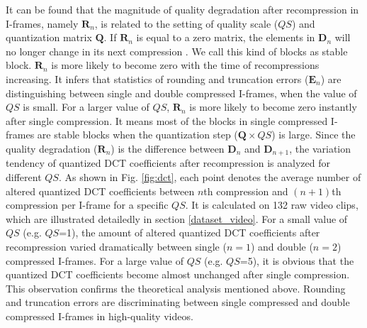 \documentclass[journal,sort]{IEEEtran}
\begin{document}
It can be found that the magnitude of quality degradation after recompression in I-frames, namely $\mathbf{R}_n$, is related to the setting of quality scale ($QS$) and quantization matrix $\mathbf{Q}$. If $\mathbf{R}_n$ is equal to a zero matrix, the elements in $\mathbf{D}_n$ will no longer change in its next compression \cite{yang2014effective}. We call this kind of blocks as stable block. $\mathbf{R}_n$ is more likely to become zero with the time of recompressions increasing. It infers that statistics of rounding and truncation errors ($\mathbf{E}_n$) are distinguishing between single and double compressed I-frames, when the value of $QS$ is small. For a larger value of $QS$, $\mathbf{R}_n$ is more likely to become zero instantly after single compression. It means most of the blocks in single compressed I-frames are stable blocks when the quantization step ($\mathbf{Q}\times QS$) is large. Since the quality degradation ($\mathbf{R}_n$) is the difference between $\mathbf{D}_n$ and $\mathbf{D}_{n+1}$, the variation tendency of quantized DCT coefficients after recompression is analyzed for different $QS$. As shown in Fig. \ref{fig:dct}, each point denotes the average number of altered quantized DCT coefficients between $n$th compression and $(n+1)$th compression per I-frame for a specific $QS$. It is calculated on 132 raw video clips, which are illustrated detailedly in section \ref{dataset_video}. For a small value of $QS$ (e.g. $QS$=1), the amount of altered quantized DCT coefficients after recompression varied dramatically between single ($n=1$) and double ($n=2$) compressed I-frames. For a large value of $QS$ (e.g. $QS$=5), it is obvious that the quantized DCT coefficients become almost unchanged after single compression. This observation confirms the theoretical analysis mentioned above. Rounding and truncation errors are discriminating between single compressed and double compressed I-frames in high-quality videos.  
\end{document}
